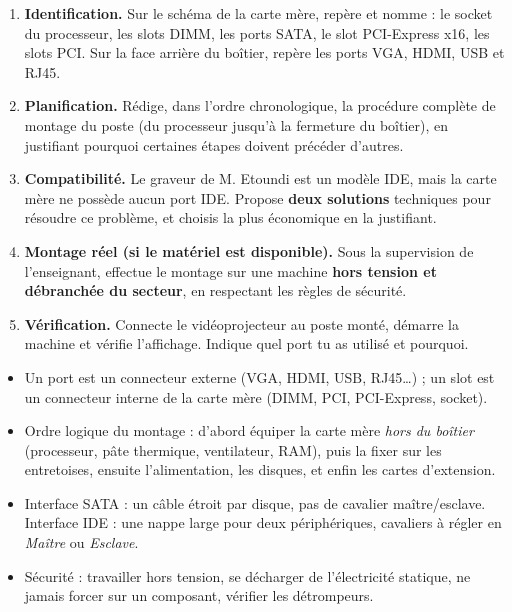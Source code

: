\documentclass[11pt]{article}
\newcommand{\cle}[1]{{\popxbold\color{popdark}#1}}
\newcounter{popsec}
\newcounter{popsub}
\newcommand{\courssub}[1]{%
  \stepcounter{popsub}%
  \par\vspace{9pt}\noindent{\popxbold\fontsize{11.5}{13}\selectfont\color{popink}{\color{poporange}\thepopsec.\thepopsub}\hspace{6pt}#1}\par\nopagebreak\vspace{4pt}
}
\begin{document}
\begin{enumerate}
  \item \textbf{Identification.} Sur le schéma de la carte mère, repère et nomme : le socket du processeur, les slots DIMM, les ports SATA, le slot PCI-Express x16, les slots PCI. Sur la face arrière du boîtier, repère les ports VGA, HDMI, USB et RJ45.
  \item \textbf{Planification.} Rédige, dans l'ordre chronologique, la procédure complète de montage du poste (du processeur jusqu'à la fermeture du boîtier), en justifiant pourquoi certaines étapes doivent précéder d'autres.
  \item \textbf{Compatibilité.} Le graveur de M. Etoundi est un modèle IDE, mais la carte mère ne possède aucun port IDE. Propose \textbf{deux solutions} techniques pour résoudre ce problème, et choisis la plus économique en la justifiant.
  \item \textbf{Montage réel (si le matériel est disponible).} Sous la supervision de l'enseignant, effectue le montage sur une machine \textbf{hors tension et débranchée du secteur}, en respectant les règles de sécurité.
  \item \textbf{Vérification.} Connecte le vidéoprojecteur au poste monté, démarre la machine et vérifie l'affichage. Indique quel port tu as utilisé et pourquoi.
\end{enumerate}

\courssub{Ressources à mobiliser}

\begin{aretenir}
\begin{itemize}
  \item Un \cle{port} est un connecteur externe (VGA, HDMI, USB, RJ45\ldots) ; un \cle{slot} est un connecteur interne de la carte mère (DIMM, PCI, PCI-Express, socket).
  \item Ordre logique du montage : d'abord équiper la carte mère \emph{hors du boîtier} (processeur, pâte thermique, ventilateur, RAM), puis la fixer sur les entretoises, ensuite l'alimentation, les disques, et enfin les cartes d'extension.
  \item Interface \cle{SATA} : un câble étroit par disque, pas de cavalier maître/esclave. Interface \cle{IDE} : une nappe large pour deux périphériques, cavaliers à régler en \emph{Maître} ou \emph{Esclave}.
  \item Sécurité : travailler hors tension, se décharger de l'électricité statique, ne jamais forcer sur un composant, vérifier les détrompeurs.
\end{itemize}
\end{aretenir}
\end{document}

